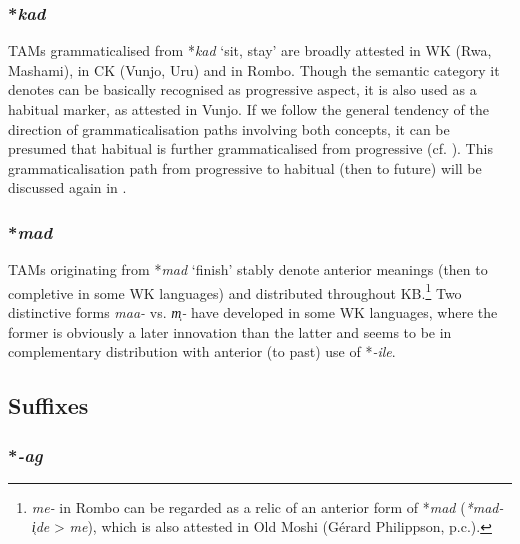 \documentclass[output=paper]{langscibook}
\begin{document}
\subsubsection{*\textit{kad}}\label{sec:shinagawa:3.2.2}

  TAMs grammaticalised from *\textit{kad} ‘sit, stay’ are broadly attested in WK (Rwa, Mashami), in CK (Vunjo, Uru) and in Rombo. Though the semantic category it denotes can be basically recognised as progressive aspect, it is also used as a habitual marker, as attested in Vunjo. If we follow the general tendency of the direction of grammaticalisation paths involving both concepts, it can be presumed that habitual is further grammaticalised from progressive (cf. \cites[93]{HeineKuteva2002}[48]{Haspelmath1998}). This grammaticalisation path from progressive to habitual (then to future) will be discussed again in .

\subsubsection{*\textit{mad}}\label{sec:shinagawa:3.2.3}

  TAMs originating from *\textit{mad} ‘finish’ stably denote anterior meanings (then to completive in some WK languages) and distributed throughout KB.\footnote{\textit{me-} in Rombo can be regarded as a relic of an anterior form of *\textit{mad} (\textit{*mad-i̜de} > \textit{me}), which is also attested in Old Moshi (Gérard Philippson, p.c.).} Two distinctive forms \textit{maa-} vs. \textit{m̩-} have developed in some WK languages, where the former is obviously a later innovation than the latter and seems to be in complementary distribution with anterior (to past) use of *\textit{{}-ile}.

\subsection{Suffixes}\label{sec:shinagawa:3.3}
\subsubsection{*\textit{{}-ag}}\label{sec:shinagawa:3.3.1}
\end{document}
